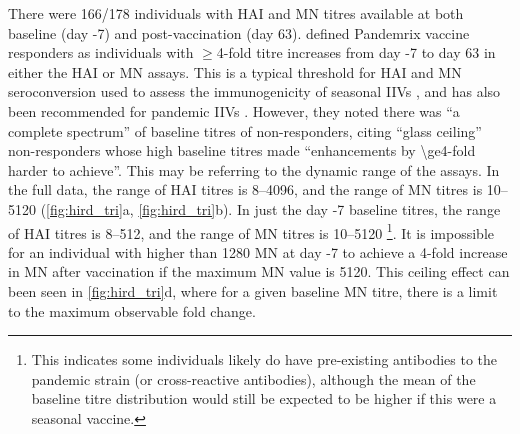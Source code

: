 There were 166/178 individuals with \gls{HAI} and \gls{MN} titres available at both baseline (day -7) and post-vaccination (day 63).
\textcite{sobolev2016AdjuvantedInfluenzaH1N1Vaccination} defined Pandemrix vaccine responders as individuals with $\ge$4-fold titre increases from day -7 to day 63 in either the \gls{HAI} or \gls{MN} assays.
This is a typical threshold for \gls{HAI} and \gls{MN} seroconversion used to assess the immunogenicity of seasonal \glspl{IIV} \autocite{krammer2019HumanAntibodyResponse}, 
and has also been recommended for pandemic \glspl{IIV} \autocite{foodanddrugadministration2007GuidanceIndustryClinical}.
However, they noted there was \enquote{a complete spectrum} of baseline titres of non-responders, citing \enquote{glass ceiling} non-responders whose high baseline titres made \enquote{enhancements by \num{\ge4}-fold harder to achieve}.
This may be referring to the dynamic range of the assays.
In the full data, the range of \gls{HAI} titres is \numrange{8}{4096}, and the range of \gls{MN} titres is \numrange{10}{5120} (\cref{fig:hird_tri}a, \cref{fig:hird_tri}b).
In just the day -7 baseline titres, the range of \gls{HAI} titres is \numrange{8}{512}, and the range of \gls{MN} titres is \numrange{10}{5120}%
\footnote{
    This indicates some individuals likely do have pre-existing antibodies to the pandemic strain (or cross-reactive antibodies),
    although the mean of the baseline titre distribution would still be expected to be higher if this were a seasonal vaccine.
}.
It is impossible for an individual with higher than 1280 \gls{MN} at day -7 to achieve a 4-fold increase in \gls{MN} after vaccination if the maximum \gls{MN} value is \num{5120}.
This ceiling effect can been seen in \cref{fig:hird_tri}d, where for a given baseline \gls{MN} titre, there is a limit to the maximum observable fold change.

